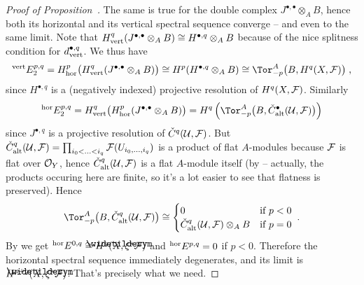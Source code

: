 \documentclass[a4paper,parskip=half,numbers=enddot, DIV=12]{scrreprt}
\begin{document}
\begin{proof}[Proof of Proposition~]
The same is true for the double complex $J^{\bullet,\bullet}\otimes_AB$, hence both its horizontal and its vertical spectral sequence converge -- and even to the same limit. Note that $H_{\mathrm{vert}}^q(J^{\bullet,\bullet}\otimes_AB)\cong H^{\bullet,q}\otimes_AB$ because of the nice splitness condition for $d_{\mathrm{vert}}^{\bullet,q}$. We thus have 
\begin{align*}
	\vphantom{E}^\ver E_2^{p,q}=H^p_\hor\big(H^q_\ver(J^{\bullet,\bullet}\otimes_AB)\big)\cong H^p(H^{\bullet,q}\otimes_AB)\cong \Tor_{-p}^A\big(B,H^q(X,\Ff)\big)\;,
\end{align*}
since $H^{\bullet,q}$ is a (negatively indexed) projective resolution of $H^q(X,\mathcal{F})$. Similarly
\begin{align*}
	\vphantom{E}^\hor E_2^{p,q}=H^q_\ver\big(H_\hor^p(J^{\bullet,\bullet}\otimes_AB)\big)=H^q\left(\Tor_{-p}^A\big(B,\check{C}_\alt^\bullet(\Uu,\Ff)\big)\right)
\end{align*}
since $J^{\bullet,q}$ is a projective resolution of $\check{C}^q(\mathcal{U},\mathcal{F})$. But $\check{C}_{\mathrm{alt}}^q(\mathcal{U},\mathcal{F})=\prod_{i_0<\ldots<i_q}\mathcal{F}(U_{i_0,\ldots,i_q})$ is a product of flat $A$-modules because $\mathcal{F}$ is flat over $\mathcal{O}_Y$, hence $\check{C}_{\mathrm{alt}}^q(\mathcal{U},\mathcal{F})$ is a flat $A$-module itself (by \cite[Example~1.2.6]{homalg} -- actually, the products occuring here are finite, so it's a lot easier to see that flatness is preserved). Hence
\begin{align*}
	\Tor_{-p}^A\big(B,\check{C}_\alt^q(\Uu,\Ff)\big)\cong
	\begin{cases}
	0 & \text{if }p<0\\
	\check{C}_\alt^q(\Uu,\Ff)\otimes_AB & \text{if }p=0
	\end{cases}\;.
\end{align*}
By  we get $\vphantom{E}^\hor E^{0,q}\cong H^q(\snake{X},\xi^*\Ff)$ and $\vphantom{E}^{\mathrm{hor}} E^{p,q}=0$ if $p<0$. Therefore the horizontal spectral sequence immediately degenerates, and its limit is $H^{p+q}(\snake{X},\xi^*\Ff)$. That's precisely what we need.
\end{proof}
\end{document}
